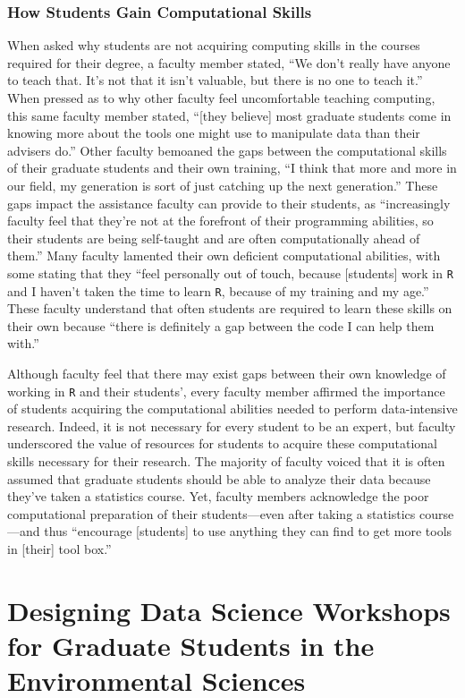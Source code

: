 \documentclass[12pt]{article}
\begin{document}
\subsubsection{How Students Gain Computational Skills}

\quad When asked why students are not acquiring computing skills in the courses
required for their degree, a faculty member stated, ``We don't really have
anyone to teach that. It's not that it isn't valuable, but there is no one to
teach it.'' When pressed as to why other faculty feel uncomfortable teaching
computing, this same faculty member stated, ``[they believe] most graduate
students come in knowing more about the tools one might use to manipulate data
than their advisers do.'' Other faculty bemoaned the gaps between the
computational skills of their graduate students and their own training, 
``I think that more and more in our field, my generation is sort of just 
catching up the next generation.'' These gaps impact the assistance faculty can
provide to their students, as ``increasingly faculty feel that they're not at 
the forefront of their programming abilities, so their students are being 
self-taught and are often computationally ahead of them.'' Many faculty 
lamented their own deficient computational abilities, with some stating that 
they ``feel personally out of touch, because [students] work in \texttt{R} and 
I haven't taken the time to learn \texttt{R}, because of my training and my
age.'' These faculty understand that often students are required to learn these
skills on their own because ``there is definitely a gap between the code I can
help them with.'' 

\quad Although faculty feel that there may exist gaps between their own
knowledge of working in \texttt{R} and their students', every faculty member
affirmed the importance of students acquiring the computational abilities needed
to perform data-intensive research. Indeed, it is not necessary for every
student to be an expert, but faculty underscored the value of resources for
students to acquire these computational skills necessary for their research. The
majority of faculty voiced that it is often assumed that graduate students
should be able to analyze their data because they've taken a statistics course.
Yet, faculty members acknowledge the poor computational preparation of their
students---even after taking a statistics course---and thus ``encourage
[students] to use anything they can find to get more tools in [their] tool
box.'' 

\section{Designing Data Science Workshops for Graduate Students in the 
Environmental Sciences}
\label{sec:workshops}
\end{document}
